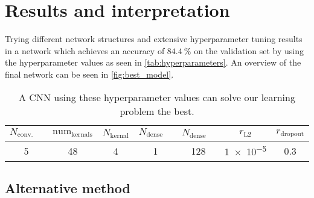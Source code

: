 \section{Results and interpretation}
\label{sec:results}
Trying different network structures and extensive hyperparameter tuning results in a network which achieves an accuracy of $\SI{84.4}{\percent}$ on the validation set by using the
hyperparameter values as seen in \autoref{tab:hyperparameters}.
An overview of the final network can be seen in \autoref{fig:best_model}.
\begin{table}
    \centering
    \caption{A CNN using these hyperparameter values can solve our learning problem the best.}
    \label{tab:hyperparameters}
    \begin{tabular}{c c c c c c c}
        \toprule
        $N_\text{conv. layers}$ & $\text{num}_\text{kernals}$ & $N_\text{kernal}$ & $N_\text{dense layers}$ & $N_\text{dense nodes}$ & $r_\text{L2}$ & $r_\text{dropout}$ \\
        \midrule
        5 & 48 & 4 & 1 & 128 & \num{1e-5} & 0.3\\
        \bottomrule
    \end{tabular}
\end{table}



\subsection{Alternative method}